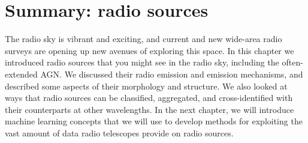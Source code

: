 \documentclass[11pt, a4paper]{book}
\begin{document}
\section{Summary: radio sources}
\label{sec:summary-radio}

    The radio sky is vibrant and exciting, and current and new wide-area radio surveys are opening up new avenues of exploring this space. In this chapter we introduced radio sources that you might see in the radio sky, including the often-extended AGN. We discussed their radio emission and emission mechanisms, and described some aspects of their morphology and structure. We also looked at ways that radio sources can be classified, aggregated, and cross-identified with their counterparts at other wavelengths. In the next chapter, we will introduce machine learning concepts that we will use to develop methods for exploiting the vast amount of data radio telescopes provide on radio sources.
\end{document}

